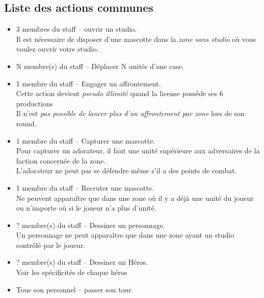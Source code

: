             \subsection{Liste des actions communes}

                \begin{itemize}
                    \item 3 membres du staff – ouvrir un studio. \\
                        Il est nécessaire de disposer d'une mascotte dans la \emph{zone sans studio} où vous voulez ouvrir votre studio.
                    \item N membre(s) du staff – Déplacer N unités d'une case.
                    \item 1 membre du staff – Engager un affrontement. \\
                        Cette action devient \textit{pseudo illimité} quand la license possède ses 6 productions \\
                        Il n'est \emph{pas possible de lancer plus d'un affrontement par zone} lors de son round.
                    \item 1 membre du staff – Capturer une mascotte. \\
                        Pour capturer un adorateur, il faut une unité supérieure aux adversaires de la faction concernée de la zone. \\
                        L'adorateur ne peut pas se défendre même s'il a des points de combat.
                    \item 1 membre du staff – Recruter une mascotte. \\
                        Ne peuvent apparaître que dans une zone où il y a déjà une unité du joueur ou
                        n'importe où si le joueur n'a plus d'unité.
                    \item ? membre(s) du staff – Dessiner un personnage. \\
                        Un personnage ne peut apparaître que dans une zone ayant un studio contrôlé par le joueur.
                    \item ? membre(s) du staff – Dessiner un Héros. \\
                        Voir les spécificités de chaque héros
                    \item Tous son personnel – passer son tour.
                \end{itemize}


